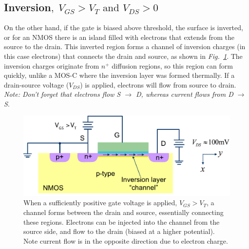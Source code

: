 \subsection{Inversion\texorpdfstring{$,\;V_{GS}>V_T\text{ and }V_{DS}>0$}{}}
On the other hand, if the gate is biased above threshold, the surface is inverted, or for an NMOS there is an island filled with electrons that extends from the source to the drain.  This inverted region forms a channel of inversion charges (in this case electrons) that connects the drain and source, as shown in \emph{Fig.~\ref{fig:mos_triode}}.  The inversion charges originate from $n^+$ diffusion regions, so this region can form quickly, unlike a MOS-C where the inversion layer was formed thermally.  If a drain-source voltage ($V_{DS}$) is applied, electrons will flow from source to drain.  \textit{Note: Don't forget that electrons flow S $\rightarrow$ D, whereas current flows from D $\rightarrow$ S}.
\newpage
\begin{figure}[t]
\centering
\includegraphics[width=\columnwidth]{mos_triode}
\caption{When a sufficiently positive gate voltage is applied, $V_{GS} > V_T$, a channel forms between the drain and source, essentially connecting these regions.  Electrons can be injected into the channel from the source side, and flow to the drain (biased at a higher potential).  Note current flow is in the opposite direction due to electron charge.}
\label{fig:mos_triode}
\end{figure}
